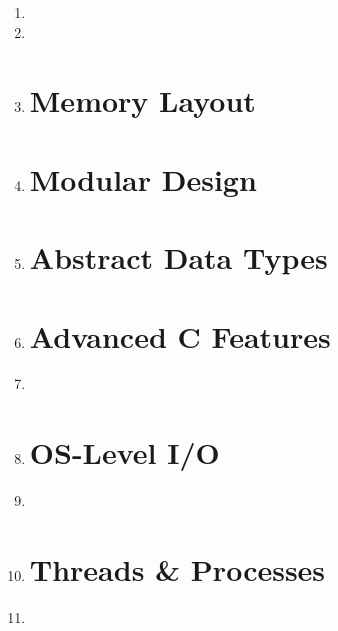 \documentclass[11pt]{article}
\begin{document}
\begin{enumerate}
		\item 

		\item 

		\item 

		\section*{Memory Layout}
		\item 

		\newpage
		\section*{Modular Design}
		\item 

		\section*{Abstract Data Types}
		\item 

		\newpage
		\section*{Advanced C Features}
		\item 
		\item 

		\section*{OS-Level I/O}
		\item 
		\item 
		\newpage
		\section*{Threads \& Processes}
		\item 
	\end{enumerate}
\end{document}
